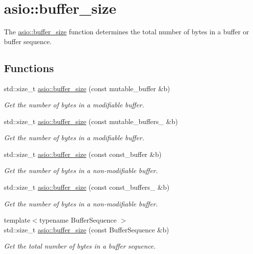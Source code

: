\hypertarget{group__buffer__size}{}\section{asio\+:\+:buffer\+\_\+size}
\label{group__buffer__size}


The \hyperlink{group__buffer__size_gabe8b5f116fbb66004b6d0ba8ee39c3d5}{asio\+::buffer\+\_\+size} function determines the total number of bytes in a buffer or buffer sequence.  


\subsection*{Functions}
\begin{DoxyCompactItemize}
\item 
std\+::size\+\_\+t \hyperlink{group__buffer__size_gabe8b5f116fbb66004b6d0ba8ee39c3d5}{asio\+::buffer\+\_\+size} (const mutable\+\_\+buffer \&b)
\begin{DoxyCompactList}\small\item\em Get the number of bytes in a modifiable buffer. \end{DoxyCompactList}\item 
std\+::size\+\_\+t \hyperlink{group__buffer__size_ga51568d795ef652942a495a95397617a6}{asio\+::buffer\+\_\+size} (const mutable\+\_\+buffers\+\_ \&b)
\begin{DoxyCompactList}\small\item\em Get the number of bytes in a modifiable buffer. \end{DoxyCompactList}\item 
std\+::size\+\_\+t \hyperlink{group__buffer__size_ga41d80aa96b2589938b695deb42eda2c7}{asio\+::buffer\+\_\+size} (const const\+\_\+buffer \&b)
\begin{DoxyCompactList}\small\item\em Get the number of bytes in a non-\/modifiable buffer. \end{DoxyCompactList}\item 
std\+::size\+\_\+t \hyperlink{group__buffer__size_gab096963a970c5183e81c428e9d98a65f}{asio\+::buffer\+\_\+size} (const const\+\_\+buffers\+\_ \&b)
\begin{DoxyCompactList}\small\item\em Get the number of bytes in a non-\/modifiable buffer. \end{DoxyCompactList}\item 
{\footnotesize template$<$typename Buffer\+Sequence $>$ }\\std\+::size\+\_\+t \hyperlink{group__buffer__size_ga2a60e9305e8e7193de581172f360657b}{asio\+::buffer\+\_\+size} (const Buffer\+Sequence \&b)
\begin{DoxyCompactList}\small\item\em Get the total number of bytes in a buffer sequence. \end{DoxyCompactList}\end{DoxyCompactItemize}


